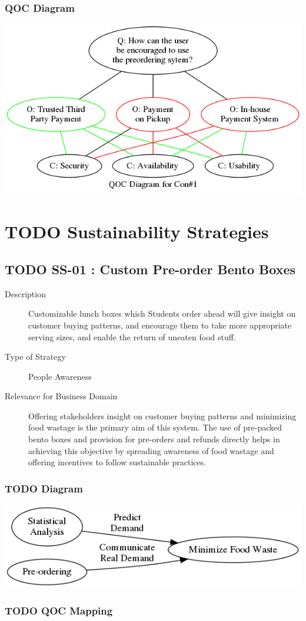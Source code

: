 \documentclass[11pt]{article}
\begin{document}
\subsubsection*{QOC Diagram}
\label{sec:org1e79f90}
\begin{center}
\includegraphics[width=.9\linewidth]{res/qoc_01.png}
\end{center}

\section{{\bfseries\sffamily TODO} Sustainability Strategies}
\label{sec:orgb2ee2e0}
\subsection{{\bfseries\sffamily TODO} \label{orgf239b75}SS-01 : Custom Pre-order Bento Boxes}
\label{sec:org63a3870}
\begin{description}
\item[{Description}] Customizable lunch boxes which Students order
ahead will give insight on customer buying
patterns, and encourage them to take more
appropriate serving sizes, and enable the return
of uneaten food stuff.
\item[{Type of Strategy}] People Awareness
\item[{Relevance for Business Domain}] Offering stakeholders insight on
customer buying patterns and minimizing food wastage is the
primary aim of this system. The use of pre-packed bento boxes
and provision for pre-orders and refunds directly helps in
achieving this objective by spreading awareness of food
wastage and offering incentives to follow sustainable
practices.
\end{description}
\subsubsection{{\bfseries\sffamily TODO} Diagram}
\label{sec:org79065e5}
\begin{center}
\includegraphics[width=.9\linewidth]{res/ss_01.png}
\end{center}

\subsubsection{{\bfseries\sffamily TODO} QOC Mapping}
\label{sec:org8bf13b0}
\end{document}
